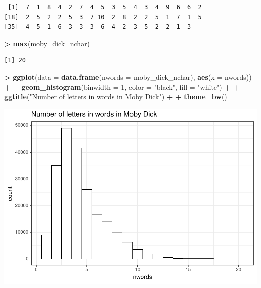 \documentclass[
]{krantz}
\makeatletter
\newenvironment{Shaded}{\begin{snugshade}}{\end{snugshade}}
\newcommand{\DataTypeTok}[1]{\textcolor[rgb]{0.27,0.27,0.27}{#1}}
\newcommand{\DecValTok}[1]{\textcolor[rgb]{0.06,0.06,0.06}{#1}}
\newcommand{\KeywordTok}[1]{\textcolor[rgb]{0.27,0.27,0.27}{\textbf{#1}}}
\newcommand{\NormalTok}[1]{#1}
\newcommand{\OperatorTok}[1]{\textcolor[rgb]{0.43,0.43,0.43}{\textbf{#1}}}
\newcommand{\StringTok}[1]{\textcolor[rgb]{0.5,0.5,0.5}{#1}}
\newenvironment{kframe}{%
\medskip{}
\setlength{\fboxsep}{.8em}
 \def\at@end@of@kframe{}%
 \ifinner\ifhmode%
  \def\at@end@of@kframe{\end{minipage}}%
  \begin{minipage}{\columnwidth}%
 \fi\fi%
 \def\FrameCommand##1{\hskip\@totalleftmargin \hskip-\fboxsep
 \colorbox{shadecolor}{##1}\hskip-\fboxsep
     \hskip-\linewidth \hskip-\@totalleftmargin \hskip\columnwidth}%
 \MakeFramed {\advance\hsize-\width
   \@totalleftmargin\z@ \linewidth\hsize
   \@setminipage}}%
 {\par\unskip\endMakeFramed%
 \at@end@of@kframe}
\renewenvironment{Shaded}{\begin{kframe}}{\end{kframe}}
\makeatother
\begin{document}
\begin{verbatim}
 [1]  7  1  8  4  2  7  4  5  3  5  4  3  4  9  6  6  2
[18]  2  5  2  2  5  3  7 10  2  8  2  2  5  1  7  1  5
[35]  4  5  1  6  3  3  3  6  4  2  3  5  2  2  1  3
\end{verbatim}

\begin{Shaded}
\begin{Highlighting}[]
\OperatorTok{\textgreater{}}\StringTok{ }\KeywordTok{max}\NormalTok{(moby\_dick\_nchar)}
\end{Highlighting}
\end{Shaded}

\begin{verbatim}
[1] 20
\end{verbatim}

\begin{Shaded}
\begin{Highlighting}[]
\OperatorTok{\textgreater{}}\StringTok{ }\KeywordTok{ggplot}\NormalTok{(}\DataTypeTok{data =} \KeywordTok{data.frame}\NormalTok{(}\DataTypeTok{nwords =}\NormalTok{ moby\_dick\_nchar), }\KeywordTok{aes}\NormalTok{(}\DataTypeTok{x =}\NormalTok{ nwords)) }\OperatorTok{+}\StringTok{ }
\OperatorTok{+}\StringTok{   }\KeywordTok{geom\_histogram}\NormalTok{(}\DataTypeTok{binwidth =} \DecValTok{1}\NormalTok{, }\DataTypeTok{color =} \StringTok{"black"}\NormalTok{, }\DataTypeTok{fill =} \StringTok{"white"}\NormalTok{) }\OperatorTok{+}\StringTok{ }
\OperatorTok{+}\StringTok{   }\KeywordTok{ggtitle}\NormalTok{(}\StringTok{"Number of letters in words in Moby Dick"}\NormalTok{) }\OperatorTok{+}\StringTok{ }
\OperatorTok{+}\StringTok{   }\KeywordTok{theme\_bw}\NormalTok{()}
\end{Highlighting}
\end{Shaded}

\includegraphics{bookdown_files/figure-latex/unnamed-chunk-285-1.pdf}
\end{document}
